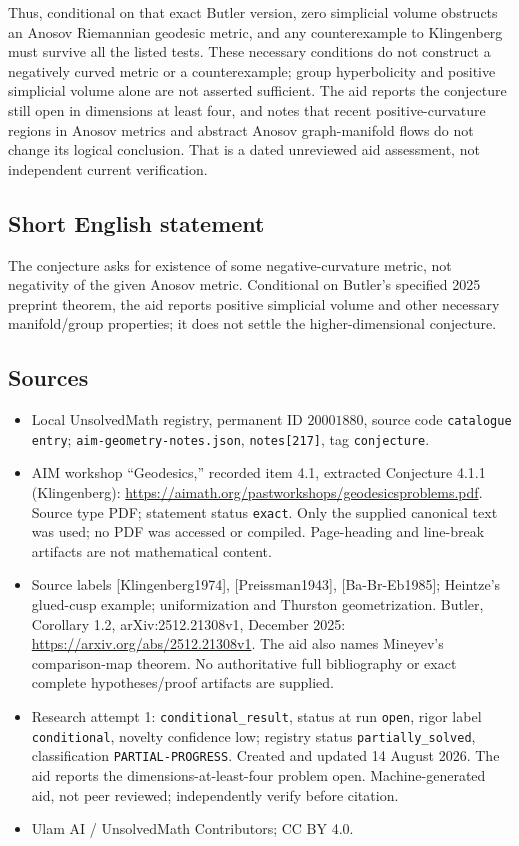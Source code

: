 \documentclass[11pt]{article}
\begin{document}
Thus, conditional on that exact Butler version, zero simplicial volume obstructs an Anosov Riemannian geodesic metric, and any counterexample to Klingenberg must survive all the listed tests. These necessary conditions do not construct a negatively curved metric or a counterexample; group hyperbolicity and positive simplicial volume alone are not asserted sufficient. The aid reports the conjecture still open in dimensions at least four, and notes that recent positive-curvature regions in Anosov metrics and abstract Anosov graph-manifold flows do not change its logical conclusion. That is a dated unreviewed aid assessment, not independent current verification.
\subsection{Short English statement}
The conjecture asks for existence of some negative-curvature metric, not negativity of the given Anosov metric. Conditional on Butler's specified 2025 preprint theorem, the aid reports positive simplicial volume and other necessary manifold/group properties; it does not settle the higher-dimensional conjecture.
\subsection{Sources}
\begin{itemize}
\item Local UnsolvedMath registry, permanent ID \(20001880\), source code \texttt{catalogue entry}; \texttt{aim-geometry-notes.json}, \texttt{notes[217]}, tag \texttt{conjecture}.
\item AIM workshop ``Geodesics,'' recorded item 4.1, extracted Conjecture 4.1.1 (Klingenberg): \url{https://aimath.org/pastworkshops/geodesicsproblems.pdf}. Source type PDF; statement status \texttt{exact}. Only the supplied canonical text was used; no PDF was accessed or compiled. Page-heading and line-break artifacts are not mathematical content.
\item Source labels [Klingenberg1974], [Preissman1943], [Ba-Br-Eb1985]; Heintze's glued-cusp example; uniformization and Thurston geometrization. Butler, Corollary 1.2, arXiv:2512.21308v1, December 2025: \url{https://arxiv.org/abs/2512.21308v1}. The aid also names Mineyev's comparison-map theorem. No authoritative full bibliography or exact complete hypotheses/proof artifacts are supplied.
\item Research attempt 1: \texttt{conditional\_result}, status at run \texttt{open}, rigor label \texttt{conditional}, novelty confidence low; registry status \texttt{partially\_solved}, classification \texttt{PARTIAL-PROGRESS}. Created and updated 14 August 2026. The aid reports the dimensions-at-least-four problem open. Machine-generated aid, not peer reviewed; independently verify before citation.
\item Ulam AI / UnsolvedMath Contributors; CC BY 4.0.
\end{itemize}
\end{document}
